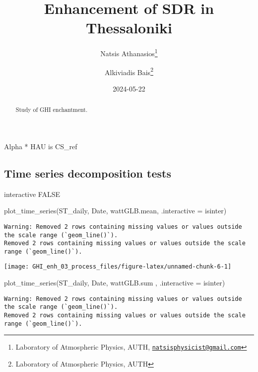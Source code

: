 \documentclass[
  10pt,
  a4paper,oneside]{article}
\title{Enhancement of SDR in Thessaloniki}
\author{Natsis Athanasios\footnote{Laboratory of Atmospheric Physics, AUTH, \href{mailto:natsisphysicist@gmail.com}{\nolinkurl{natsisphysicist@gmail.com}}} \and Alkiviadis Bais\footnote{Laboratory of Atmospheric Physics, AUTH}}
\date{2024-05-22}
\newenvironment{Shaded}{\begin{snugshade}}{\end{snugshade}}
\newcommand{\AttributeTok}[1]{\textcolor[rgb]{0.77,0.63,0.00}{#1}}
\newcommand{\FunctionTok}[1]{\textcolor[rgb]{0.00,0.00,0.00}{#1}}
\newcommand{\NormalTok}[1]{#1}
\begin{document}
\maketitle
\begin{abstract}
Study of GHI enchantment.
\end{abstract}

{
\hypersetup{linkcolor=}
\setcounter{tocdepth}{4}
\tableofcontents
}
Alpha * HAU is CS\_ref

\hypertarget{time-series-decomposition-tests}{%
\subsection{Time series decomposition tests}\label{time-series-decomposition-tests}}

interactive FALSE

\begin{Shaded}
\begin{Highlighting}[]
\FunctionTok{plot\_time\_series}\NormalTok{(ST\_daily, Date, wattGLB.mean, }\AttributeTok{.interactive =}\NormalTok{ isinter)}
\end{Highlighting}
\end{Shaded}

\begin{verbatim}
Warning: Removed 2 rows containing missing values or values outside the scale range (`geom_line()`).
Removed 2 rows containing missing values or values outside the scale range (`geom_line()`).
\end{verbatim}

\begin{center}\texttt{[image: GHI\_enh\_03\_process\_files/figure-latex/unnamed-chunk-6-1]} \end{center}

\begin{Shaded}
\begin{Highlighting}[]
\FunctionTok{plot\_time\_series}\NormalTok{(ST\_daily, Date, wattGLB.sum , }\AttributeTok{.interactive =}\NormalTok{ isinter)}
\end{Highlighting}
\end{Shaded}

\begin{verbatim}
Warning: Removed 2 rows containing missing values or values outside the scale range (`geom_line()`).
Removed 2 rows containing missing values or values outside the scale range (`geom_line()`).
\end{verbatim}
\end{document}
